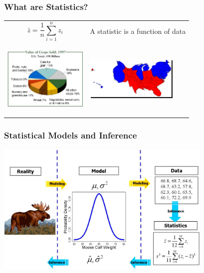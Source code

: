 \documentclass[mathserif,compress]{beamer}\usepackage{graphicx, color}
\def\bdm{\begin{displaymath}}
\def\edm{\end{displaymath}}
\begin{document}
\begin{frame} 
\frametitle{What are Statistics?}
     
	\begin{tabular} {p{4.5cm} p{4.5cm}}

			{\bdm
				\bar{z} = \frac{1}{n}\sum_{i = 1}^n z_i 
			\edm} &
			\vspace{.2cm}
			{A statistic is a function of data} 
		  \\
		
		\begin{center}
		  \vspace{-.5cm}
			\includegraphics[width=4.0cm]{figure/pieChart.jpeg} 
		  \vspace{.5cm}
		\end{center} &
		\begin{center}
			\includegraphics[width=4.4cm]{figure/voteMap.jpg} 
		  \vspace{.5cm}
		\end{center} 
		

	\end{tabular}

\end{frame}


\begin{frame} 
\frametitle{Statistical Models and Inference}
     
		\begin{center}
		  \vspace{-.5cm}
			\includegraphics[width=10.4cm]{figure/statModInfer.jpeg} 
		\end{center} 
\end{frame}
  
\end{document}
